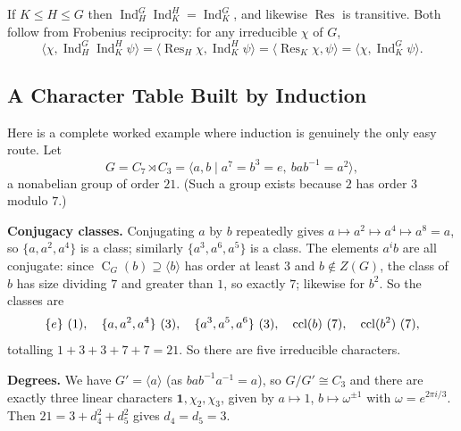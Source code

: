 \documentclass[a4paper]{scrartcl}
\newcommand{\Ind}{\operatorname{Ind}}
\newcommand{\Res}{\operatorname{Res}}
\newcommand{\Cent}{\operatorname{C}}
\newcommand{\ip}[2]{\langle #1, #2 \rangle}
\newcommand{\gen}[1]{\langle #1 \rangle}
\begin{document}
\begin{remark}
	If $K\leq H\leq G$ then $\Ind_H^G\Ind_K^H = \Ind_K^G$, and likewise $\Res$ is transitive. Both follow from Frobenius reciprocity: for any irreducible $\chi$ of $G$,
	$$\ip{\chi}{\Ind_H^G\Ind_K^H\psi} = \ip{\Res_H\chi}{\Ind_K^H\psi} = \ip{\Res_K\chi}{\psi} = \ip\chi{\Ind_K^G\psi}.$$
\end{remark}

\subsection{A Character Table Built by Induction}

Here is a complete worked example where induction is genuinely the only easy route. Let
$$G = C_7\rtimes C_3 = \gen{a, b \mid a^7 = b^3 = e,\ bab^{-1} = a^2},$$
a nonabelian group of order $21$. (Such a group exists because $2$ has order $3$ modulo $7$.)

\textbf{Conjugacy classes.} Conjugating $a$ by $b$ repeatedly gives $a\mapsto a^2\mapsto a^4\mapsto a^8 = a$, so $\{a,a^2,a^4\}$ is a class; similarly $\{a^3,a^6,a^5\}$ is a class. The elements $a^ib$ are all conjugate: since $\Cent_G(b)\supseteq\gen b$ has order at least $3$ and $b\notin Z(G)$, the class of $b$ has size dividing $7$ and greater than $1$, so exactly $7$; likewise for $b^2$. So the classes are
$$\{e\}\ (1),\quad \{a,a^2,a^4\}\ (3),\quad\{a^3,a^5,a^6\}\ (3),\quad \ccl(b)\ (7),\quad\ccl(b^2)\ (7),$$
totalling $1+3+3+7+7 = 21$. So there are five irreducible characters.

\textbf{Degrees.} We have $G' = \gen a$ (as $bab^{-1}a^{-1} = a$), so $G/G'\cong C_3$ and there are exactly three linear characters $\mathbf 1,\chi_2,\chi_3$, given by $a\mapsto1$, $b\mapsto\omega^{\pm1}$ with $\omega = e^{2\pi i/3}$. Then $21 = 3 + d_4^2+d_5^2$ gives $d_4 = d_5 = 3$.
\end{document}
